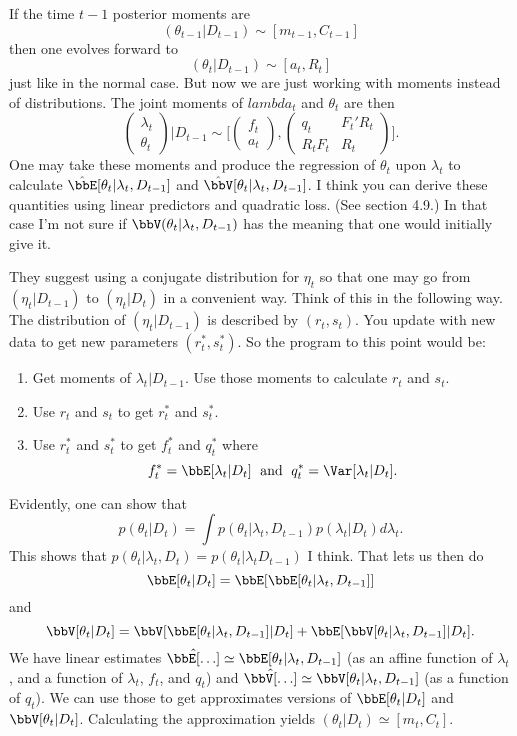 \documentclass{article}
\begin{document}
\begin{outline}
If the time $t-1$ posterior moments are
\[
(\theta_{t-1} | D_{t-1}) \sim [m_{t-1}, C_{t-1}]
\]
then one evolves forward to
\[
(\theta_t | D_{t-1}) \sim [a_t, R_t]
\]
just like in the normal case.  But now we are just working with moments instead
of distributions.  The joint moments of $lambda_t$ and $\theta_t$ are then
\[
\begin{pmatrix} \lambda_t \\ \theta_t \end{pmatrix} | D_{t-1}
\sim
\Big[
\begin{pmatrix} f_t \\ a_t \end{pmatrix},
\begin{pmatrix}q_t & F_t' R_t \\ R_t F_t & R_t \end{pmatrix} \Big].
\]
One may take these moments and produce the regression of $\theta_t$ upon
$\lambda_t$ to calculate $\hat \bbE[ \theta_t | \lambda_t, D_{t-1}]$ and $\hat
\bbV[ \theta_t | \lambda_t, D_{t-1}]$.  I think you can derive these quantities
using linear predictors and quadratic loss.  (See section 4.9.)  In that case
I'm not sure if $\bbV(\theta_t | \lambda_t, D_{t-1})$ has the meaning that one
would initially give it.

They suggest using a conjugate distribution for $\eta_t$ so that one may go from
$(\eta_t | D_{t-1})$ to $(\eta_t | D_t)$ in a convenient way.  Think of this in
the following way.  The distribution of $(\eta_t | D_{t-1})$ is described by
$(r_t, s_t)$.  You update with new data to get new parameters $(r_t^*, s_t^*)$.
So the program to this point would be:

\begin{enumerate}
\item Get moments of $\lambda_t | D_{t-1}$.  Use those moments to calculate
  $r_t$ and $s_t$.

\item Use $r_t$ and $s_t$ to get $r_t^*$ and $s_t^*$.

\item Use $r_t^*$ and $s_t^*$ to get $f_t^*$ and $q_t^*$ where
\[
f_t^* = \bbE[\lambda_t | D_t] \; \text{ and } \; q_t^* = \Var[\lambda_t | D_t].
\]  
\end{enumerate}

Evidently, one can show that
\[
p(\theta_t | D_t) = \int p(\theta_t | \lambda_t, D_{t-1}) p(\lambda_t | D_t) d \lambda_t.
\]
This shows that $p(\theta_t | \lambda_t, D_t) = p(\theta_t | \lambda_t D_{t-1})$
I think.  That lets us then do
\[
\bbE[\theta_t | D_t] = \bbE[ \bbE[ \theta_t | \lambda_t, D_{t-1}] ]
\]
and
\[
\bbV[\theta_t | D_{t}] = 
\bbV[ \bbE[ \theta_t | \lambda_t, D_{t-1}] | D_{t} ] + 
\bbE[ \bbV[\theta_t | \lambda_t, D_{t-1}] | D_t ].
\]
We have linear estimates $\hat \bbE[\ldots] \simeq \bbE[\theta_t | \lambda_t,
D_{t-1}]$ (as an affine function of $\lambda_t$, and a function of $\lambda_t$,
$f_t$, and $q_t$) and $\hat \bbV[\ldots] \simeq \bbV[\theta_t | \lambda_t,
D_{t-1}]$ (as a function of $q_t$).  We can use those to get approximates
versions of $\bbE[\theta_t | D_{t}]$ and $\bbV[\theta_t | D_t]$.  Calculating
the approximation yields $(\theta_t | D_t) \simeq [m_t, C_t]$.


\end{outline}
\end{document}
